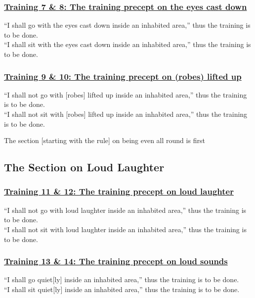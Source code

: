 \subsubsection*{\hyperref[sekh7-8]{Training 7 \& 8: The training precept on the eyes cast down}}
\label{training7-8}
``I shall go with the eyes cast down inside an inhabited area,'' thus the training is to be done.\\
``I shall sit with the eyes cast down inside an inhabited area,'' thus the training is to be done.



\subsubsection*{\hyperref[sekh9-10]{Training 9 \& 10: The training precept on (robes) lifted up}}
\label{training9-10}
``I shall not go with [robes] lifted up inside an inhabited area,'' thus the training is to be done.\\
``I shall not sit with [robes] lifted up inside an inhabited area,'' thus the training is to be done.

\begin{center}
	The section [starting with the rule] on being even all round is first
\end{center}



\setsubsecheadstyle{\subsectionFmt}
\subsection{The Section on Loud Laughter}

\subsubsection*{\hyperref[sekh11-12]{Training 11 \& 12: The training precept on loud laughter}}
\label{training11-12}
``I shall not go with loud laughter inside an inhabited area,'' thus the training is to be done.\\
``I shall not sit with loud laughter inside an inhabited area,'' thus the training is to be done.



\subsubsection*{\hyperref[sekh13-14]{Training 13 \& 14: The training precept on loud sounds}}
\label{training13-14}
``I shall go quiet[ly] inside an inhabited area,'' thus the training is to be done.\\
``I shall sit quiet[ly] inside an inhabited area,'' thus the training is to be done.



